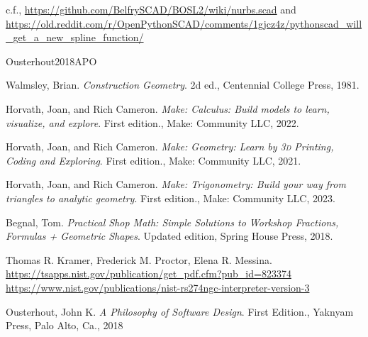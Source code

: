 \documentclass{ltxdoc}
\begin{document}
c.f., \url{https://github.com/BelfrySCAD/BOSL2/wiki/nurbs.scad} and \url{https://old.reddit.com/r/OpenPythonSCAD/comments/1gjcz4z/pythonscad_will_get_a_new_spline_function/}



\clearpage



\begin{thebibliography}{Ousterhout2018APO}

Walmsley, Brian. \emph{Construction Geometry}. 2d ed., Centennial College Press, 1981.
 
Horvath, Joan, and Rich Cameron. 
\emph{Make: Calculus: Build models to learn, visualize, and explore}. First edition., 
Make: Community LLC, 2022.
 
Horvath, Joan, and Rich Cameron. 
\emph{Make: Geometry: Learn by \textsc{3d} Printing, Coding and Exploring}. First edition., 
Make: Community LLC, 2021.

Horvath, Joan, and Rich Cameron. 
\emph{Make: Trigonometry: Build your way from triangles to analytic geometry}. First edition., 
Make: Community LLC, 2023.
 
Begnal, Tom. \emph{Practical Shop Math: Simple Solutions to Workshop Fractions, Formulas + Geometric Shapes}. Updated edition, Spring House Press, 2018.
 
Thomas R. Kramer, Frederick M. Proctor, Elena R. Messina.\\
\mbox{\url{https://tsapps.nist.gov/publication/get_pdf.cfm?pub_id=823374}}\\
\url{https://www.nist.gov/publications/nist-rs274ngc-interpreter-version-3}

Ousterhout, John K.
\emph{A Philosophy of Software Design}. First Edition., Yaknyam Press, Palo Alto, Ca., 2018

\end{thebibliography}
\thispagestyle{plain}
\clearpage

\printglossary[type=main, title={Command Glossary}]
\thispagestyle{plain}

\createindexes

  
\writeoutfiles
\end{document}
